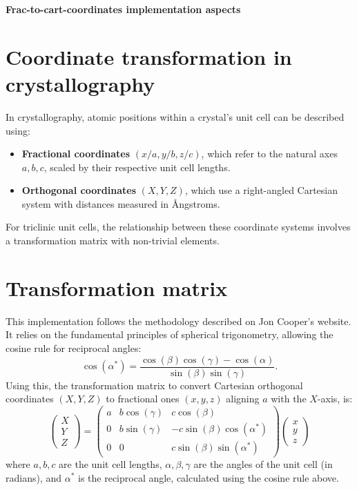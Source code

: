 \documentclass[12pt,a4paper,oneside]{article}
\begin{document}
	 \begin{center}
		\LARGE{\textbf{Frac-to-cart-coordinates implementation aspects}}\\
		\vspace{1cm}
	\end{center}

\section*{Coordinate transformation in crystallography}
In crystallography, atomic positions within a crystal's unit cell can be described using:
\begin{itemize}
	\item \textbf{Fractional coordinates} $(x/a, y/b, z/c)$, which refer to the natural axes \(a, b, c\), scaled by their respective unit cell lengths.
	
	\item \textbf{Orthogonal coordinates} $(X, Y, Z)$, which use a right-angled Cartesian system with distances measured in Ångstroms.
	
\end{itemize}
For triclinic unit cells, the relationship between these coordinate systems involves a transformation matrix with non-trivial elements.

\section*{Transformation matrix}
This implementation follows the methodology described on Jon Cooper's website\cite{Cooper-site}. It relies on the fundamental principles of spherical trigonometry, allowing the cosine rule for reciprocal angles:
\begin{equation}
	\cos(\alpha^*) = \frac{\cos(\beta)\cos(\gamma) - \cos(\alpha)}{\sin(\beta)\sin(\gamma)}.
\end{equation}
Using this, the transformation matrix to convert Cartesian orthogonal coordinates $(X, Y, Z)$ to fractional ones $(x, y, z)$ aligning $a$ with the $X$-axis, is:	
\begin{equation}
	\begin{pmatrix}
		X \\
		Y \\
		Z
	\end{pmatrix}
	=
	\begin{pmatrix}
		a & b\cos(\gamma) & c\cos(\beta) \\
		0 & b\sin(\gamma) & -c\sin(\beta)\cos(\alpha^*) \\
		0 & 0 & c\sin(\beta)\sin(\alpha^*)
	\end{pmatrix}
	\begin{pmatrix}
		x \\
		y \\
		z
	\end{pmatrix}
\end{equation}
where $a, b, c$ are the unit cell lengths, $\alpha, \beta, \gamma$ are the angles of the unit cell (in radians), and $\alpha^*$ is the reciprocal angle, calculated using the cosine rule above.

	
\end{document}
